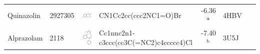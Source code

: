 \documentclass[aps,pre,twocolumn,nofootinbib,superscriptaddress,10pt, final,tightenlines]{revtex4-1}
\begin{document}
\begin{table}
\begin{center}
\begin{tabular}{llp{2cm}>{\ttfamily}lS[table-format=-1.2, table-figures-uncertainty=1]ll}
Quinazolin                   & 2927305                                & \parbox[c]{1em}{\includegraphics[scale=0.15]{figures/new-bromo/2927305.pdf}}  & CN1Cc2cc(ccc2NC1=O)Br                                            & -6.36$^{\rm a}$                               & 4HBV~\cite{Fish:2012:J.Med.Chem.}          & \cite{Fish:2012:J.Med.Chem.}            \\
Alprazolam                   & 2118                                   & \parbox[c]{1em}{\includegraphics[scale=0.15]{figures/new-bromo/2118.pdf}}     & Cc1nnc2n1-c3ccc(cc3C(=NC2)c4ccccc4)Cl                            & -7.40$^{\rm b}$                               & 3U5J~\cite{Fill:2012:Bioorg.Med.Chem.}     & \cite{Fill:2012:Bioorg.Med.Chem.}       \\ 

\end{tabular}
\end{center}
\end{table}
\end{document}
